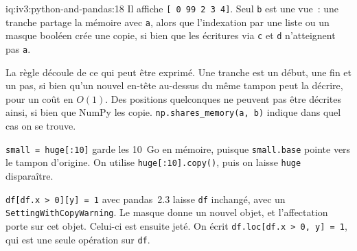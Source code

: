 \begin{solution}{iq:iv3:python-and-pandas:18}
Il affiche \texttt{[ 0 99  2  3  4]}. Seul \texttt{b} est une vue~: une tranche partage la mémoire avec \texttt{a}, alors que l'indexation par une liste ou un masque booléen crée une copie, si bien que les écritures via \texttt{c} et \texttt{d} n'atteignent pas \texttt{a}.

La règle découle de ce qui peut être exprimé. Une tranche est un début, une fin et un pas, si bien qu'un nouvel en-tête au-dessus du même tampon peut la décrire, pour un coût en $O(1)$. Des positions quelconques ne peuvent pas être décrites ainsi, si bien que NumPy les copie. \texttt{np.shares\_memory(a, b)} indique dans quel cas on se trouve.

\texttt{small = huge[:10]} garde les 10~Go en mémoire, puisque \texttt{small.base} pointe vers le tampon d'origine. On utilise \texttt{huge[:10].copy()}, puis on laisse \texttt{huge} disparaître.

\texttt{df[df.x > 0][\textquotesingle y\textquotesingle] = 1} avec pandas~2.3 laisse \texttt{df} inchangé, avec un \texttt{SettingWithCopyWarning}. Le masque donne un nouvel objet, et l'affectation porte sur cet objet. Celui-ci est ensuite jeté. On écrit \texttt{df.loc[df.x > 0, \textquotesingle y\textquotesingle] = 1}, qui est une seule opération sur \texttt{df}.

\end{solution}

